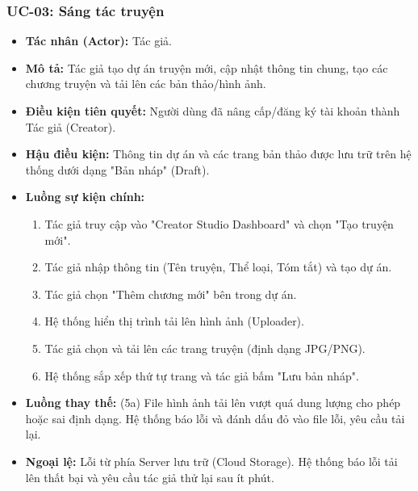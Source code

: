 \subsubsection{UC-03: Sáng tác truyện}
\begin{itemize}
    \item \textbf{Tác nhân (Actor):} Tác giả.
    \item \textbf{Mô tả:} Tác giả tạo dự án truyện mới, cập nhật thông tin chung, tạo các chương truyện và tải lên các bản thảo/hình ảnh.
    \item \textbf{Điều kiện tiên quyết:} Người dùng đã nâng cấp/đăng ký tài khoản thành Tác giả (Creator).
    \item \textbf{Hậu điều kiện:} Thông tin dự án và các trang bản thảo được lưu trữ trên hệ thống dưới dạng "Bản nháp" (Draft).
    \item \textbf{Luồng sự kiện chính:}
    \begin{enumerate}
        \item Tác giả truy cập vào "Creator Studio Dashboard" và chọn "Tạo truyện mới".
        \item Tác giả nhập thông tin (Tên truyện, Thể loại, Tóm tắt) và tạo dự án.
        \item Tác giả chọn "Thêm chương mới" bên trong dự án.
        \item Hệ thống hiển thị trình tải lên hình ảnh (Uploader).
        \item Tác giả chọn và tải lên các trang truyện (định dạng JPG/PNG).
        \item Hệ thống sắp xếp thứ tự trang và tác giả bấm "Lưu bản nháp".
    \end{enumerate}
    \item \textbf{Luồng thay thế:} (5a) File hình ảnh tải lên vượt quá dung lượng cho phép hoặc sai định dạng. Hệ thống báo lỗi và đánh dấu đỏ vào file lỗi, yêu cầu tải lại.
    \item \textbf{Ngoại lệ:} Lỗi từ phía Server lưu trữ (Cloud Storage). Hệ thống báo lỗi tải lên thất bại và yêu cầu tác giả thử lại sau ít phút.
\end{itemize}

